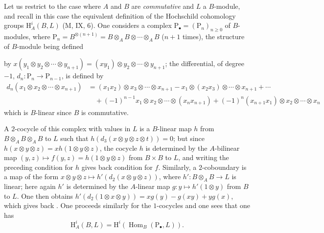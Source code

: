 \begin{env}[18.4.4]
\label{0.18.4.4}
Let us restrict to the case where $A$ and $B$ are \emph{commutative} and $L$ a $B$-module, and recall in this case the equivalent definition of the Hochschild cohomology groups $\mathrm{H}^i_A(B,L)$ (M, IX, 6).
One considers a complex $\mathrm{P}_\bullet=(\mathrm{P}_n)_{n\geqslant 0}$ of $B$-modules, where $\mathrm{P}_n=B^{\otimes(n+1)}=B\otimes_A B\otimes\cdots\otimes_A B$ ($n+1$ times), the structure of $B$-module being defined


by $x(y_1\otimes y_2\otimes\cdots\otimes y_{n+1})=(xy_1)\otimes y_2\otimes\cdots\otimes y_{n+1}$; the differential, of degree $-1$, $d_n:\mathrm{P}_n\to\mathrm{P}_{n-1}$, is defined by
\begin{align*}
  d_n(x_1\otimes x_2\otimes\cdots\otimes x_{n+1})&=(x_1 x_2)\otimes x_3\otimes\cdots\otimes x_{n+1}-x_1\otimes(x_2 x_3)\otimes\cdots\otimes x_{n+1}+\cdots\\
  &\quad +(-1)^{n-1} x_1\otimes x_2\otimes\cdots\otimes(x_n x_{n+1})+(-1)^n(x_{n+1} x_1)\otimes x_2\otimes\cdots\otimes x_n
\end{align*}
which is $B$-linear since $B$ is commutative.

A $2$-cocycle of this complex with values in $L$ is a $B$-linear map $h$ from $B\otimes_A B\otimes_A B$ to $L$ such that $h(d_3(x\otimes y\otimes z\otimes t))=0$; but since $h(x\otimes y\otimes z)=xh(1\otimes y\otimes z)$, the cocycle $h$ is determined by the $A$-bilinear map $(y,z)\mapsto f(y,z)=h(1\otimes y\otimes z)$ from $B\times B$ to $L$, and writing the preceding condition for $h$ gives back condition  for $f$.
Similarly, a $2$-coboundary is a map of the form $x\otimes y\otimes z\mapsto h'(d_2(x\otimes y\otimes z))$, where $h':B\otimes_A B\to L$ is linear; here again $h'$ is determined by the $A$-linear map $g:y\mapsto h'(1\otimes y)$ from $B$ to $L$.
One then obtains $h'(d_2(1\otimes x\otimes y))=xg(y)-g(xy)+yg(x)$, which gives back .
One proceeds similarly for the $1$-cocycles and one sees that one has
\begin{equation}
\tag{18.4.4.1}
  \label{0.18.4.4.1}
  \mathrm{H}^i_A(B,L)=\mathrm{H}^i(\operatorname{Hom}_B(\mathrm{P}_\bullet,L)).
\end{equation}
\end{env}

